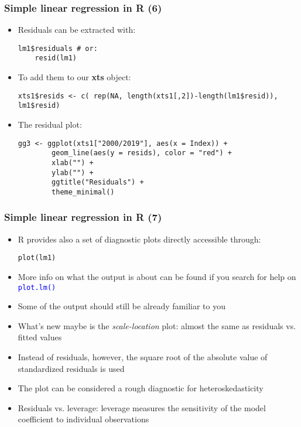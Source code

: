 \documentclass[10pt]{beamer}
\newcommand{\cc}[1]{\texttt{\textcolor{blue}{#1}}}
\theoremstyle{definition}
\begin{document}
\begin{frame}[fragile]
\frametitle{Simple linear regression in R (6)}
\begin{itemize}
	\item Residuals can be extracted with:
	\begin{lstlisting}[style = rstyle, breaklines]
	lm1$residuals # or:
	resid(lm1)
	\end{lstlisting}
	\item To add them to our \textbf{xts} object:
	\begin{lstlisting}[style = rstyle, breaklines]
	xts1$resids <- c( rep(NA, length(xts1[,2])-length(lm1$resid)), lm1$resid)
	\end{lstlisting}
	\item The residual plot:
	\begin{lstlisting}[style = rstyle, breaklines]
	gg3 <- ggplot(xts1["2000/2019"], aes(x = Index)) +
		geom_line(aes(y = resids), color = "red") + 
		xlab("") + 
		ylab("") + 
		ggtitle("Residuals") + 
		theme_minimal()
	\end{lstlisting}
\end{itemize}
\end{frame}

\begin{frame}[fragile]
\frametitle{Simple linear regression in R (7)}
\begin{itemize}
	\item R provides also a set of diagnostic plots directly accessible through:
	\begin{lstlisting}[style = rstyle, breaklines]
	plot(lm1)
	\end{lstlisting}
	
	\item More info on what the output is about can be found if you search for help on \cc{plot.lm()}
	
	\item Some of the output should still be already familiar to you
	
	\item What's new maybe is the \textit{scale-location} plot: almost the same as residuals vs. fitted values
	
	\item Instead of residuals, however, the square root of the absolute value of standardized residuals is used
	
	\item The plot can be considered a rough diagnostic for heteroskedasticity
	
	\item Residuals vs. leverage: leverage measures the sensitivity of the model coefficient to individual observations
\end{itemize}
\end{frame}
\end{document}
